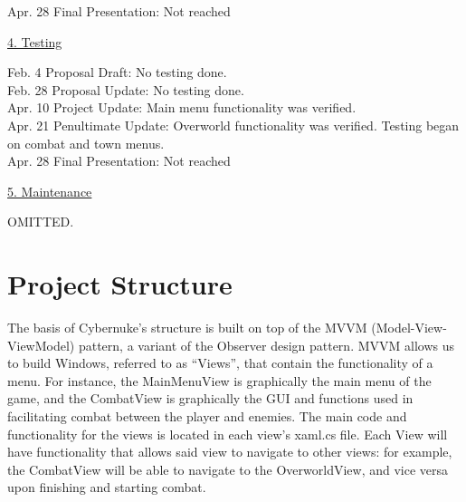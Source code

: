 \documentclass[10pt,conference,onecolumn,compsoc]{IEEEtran}
\begin{document}
Apr. 28 Final Presentation: Not reached

\vspace{5px}
\underline{4. Testing}
\vspace{5px}

Feb. 4 Proposal Draft: No testing done.\\

Feb. 28 Proposal Update: No testing done.\\

Apr. 10 Project Update: Main menu functionality was verified.\\

Apr. 21 Penultimate Update: Overworld functionality was verified. Testing began on combat and town menus.\\

Apr. 28 Final Presentation: Not reached

\vspace{5px}
\underline{5. Maintenance}
\vspace{5px}

OMITTED.


\section{Project Structure}

The basis of Cybernuke's structure is built on top of the MVVM (Model-View-ViewModel) pattern, a variant of the Observer design pattern. MVVM allows us to build Windows, referred to as “Views”, that contain the functionality of a menu. For instance, the MainMenuView is graphically the main menu of the game, and the CombatView is graphically the GUI and functions used in facilitating combat between the player and enemies. The main code and functionality for the views is located in each view's xaml.cs file. Each View will have functionality that allows said view to navigate to other views: for example, the CombatView will be able to navigate to the OverworldView, and vice versa upon finishing and starting combat.
\end{document}
